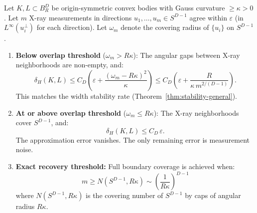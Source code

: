 \begin{theorem}
\label{thm:xray}
Let $K, L \subset B_R^D$ be origin-symmetric convex bodies with Gauss curvature $\geq \kappa > 0$. Let $m$ X-ray measurements in directions $u_1, \ldots, u_m \in S^{D-1}$ agree within $\varepsilon$ (in $L^\infty(u_i^\perp)$ for each direction). Let $\omega_m$ denote the covering radius of $\{u_i\}$ on $S^{D-1}$.

\begin{enumerate}[label=(\alph*)]
  \item \textbf{Below overlap threshold} ($\omega_m > R\kappa$): The angular gaps between X-ray neighborhoods are non-empty, and:
  \[
    \delta_H(K, L) \leq C_D \!\left(\varepsilon + \frac{(\omega_m - R\kappa)^2}{\kappa}\right) \leq C_D\!\left(\varepsilon + \frac{R}{\kappa \, m^{2/(D-1)}}\right).
  \]
  This matches the width stability rate (Theorem~\ref{thm:stability-general}).

  \item \textbf{At or above overlap threshold} ($\omega_m \leq R\kappa$): The X-ray neighborhoods cover $S^{D-1}$, and:
  \[
    \boxed{\delta_H(K, L) \leq C_D \, \varepsilon.}
  \]
  The approximation error vanishes. The only remaining error is measurement noise.

  \item \textbf{Exact recovery threshold:} Full boundary coverage is achieved when:
  \[
    m \geq N(S^{D-1}, R\kappa) \sim \left(\frac{1}{R\kappa}\right)^{D-1}
  \]
  where $N(S^{D-1}, R\kappa)$ is the covering number of $S^{D-1}$ by caps of angular radius $R\kappa$.
\end{enumerate}
\end{theorem}

